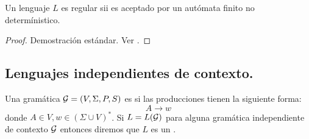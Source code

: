 \documentclass[tesis.tex]{subfiles}
\begin{document}
\begin{teo}
 Un lenguaje $L$ es regular sii es aceptado por un autómata finito no determínistico.
\end{teo}

\begin{proof}
	Demostración estándar. Ver \cite{hopcraft-ullman}.
\end{proof}









\subsection{Lenguajes independientes de contexto.}
\begin{deff}
	Una gramática ${\cal G} = (V, \Sigma, P, S) $ es  si las producciones tienen la siguiente forma:
	\begin{equation*}
	A \to w
	\end{equation*}
	donde $A \in V, w \in (\Sigma \cup V)^*$.  
	Si $L=L({\cal G})$ para alguna gramática independiente de contexto $\cal G$ entonces diremos que $L$ es un .
\end{deff}
\end{document}
